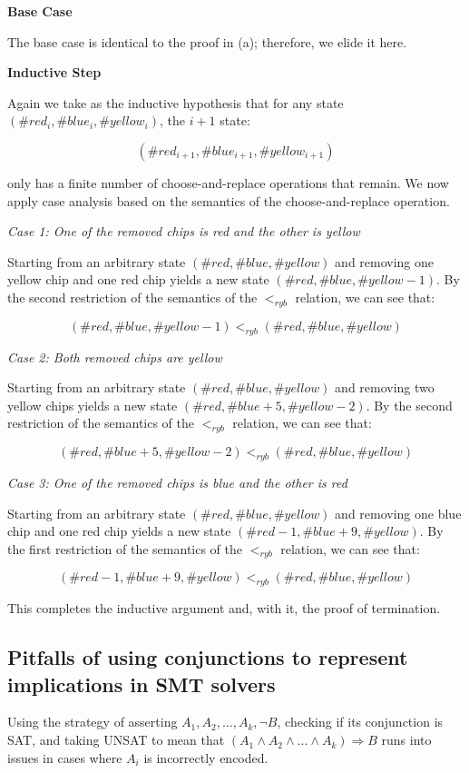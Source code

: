 \documentclass{article}
\begin{document}
\textbf{Base Case}

The base case is identical to the proof in (a); therefore, we elide it here.

\textbf{Inductive Step}

Again we take as the inductive hypothesis that for any state $(\#red_i, \#blue_i, \#yellow_i)$, the $i + 1$ state:

$$(\#red_{i + 1}, \#blue_{i + 1}, \#yellow_{i + 1})$$

only has a finite number of choose-and-replace operations that remain. We now apply case analysis based on the semantics of the choose-and-replace operation.

\emph{Case 1: One of the removed chips is red and the other is yellow}

Starting from an arbitrary state $(\#red, \#blue, \#yellow)$ and removing one yellow chip and one red chip yields a new state $(\#red, \#blue, \#yellow - 1)$. By the second restriction of the semantics of the $<_{ryb}$ relation, we can see that:

$$
(\#red, \#blue, \#yellow - 1) <_{ryb} (\#red, \#blue, \#yellow)
$$

\emph{Case 2: Both removed chips are yellow}

Starting from an arbitrary state $(\#red, \#blue, \#yellow)$ and removing two yellow chips yields a new state $(\#red , \#blue + 5, \#yellow - 2)$. By the second restriction of the semantics of the $<_{ryb}$ relation, we can see that:

$$
(\#red, \#blue + 5, \#yellow - 2) <_{ryb} (\#red, \#blue, \#yellow)
$$

\emph{Case 3: One of the removed chips is blue and the other is red}

Starting from an arbitrary state $(\#red, \#blue, \#yellow)$ and removing one blue chip and one red chip yields a new state $(\#red - 1, \#blue + 9, \#yellow)$. By the first restriction of the semantics of the $<_{ryb}$ relation, we can see that:

$$
(\#red - 1, \#blue + 9, \#yellow) <_{ryb} (\#red, \#blue, \#yellow)
$$

This completes the inductive argument and, with it, the proof of termination.

\subsection{Pitfalls of using conjunctions to represent implications in SMT solvers}

Using the strategy of asserting $A_1, A_2,..., A_k, \lnot B$, checking if its conjunction is SAT, and taking UNSAT to mean that $(A_1 \land A_2 \land ... \land A_k) \Longrightarrow B$ runs into issues in cases where $A_i$ is incorrectly encoded.
\end{document}
